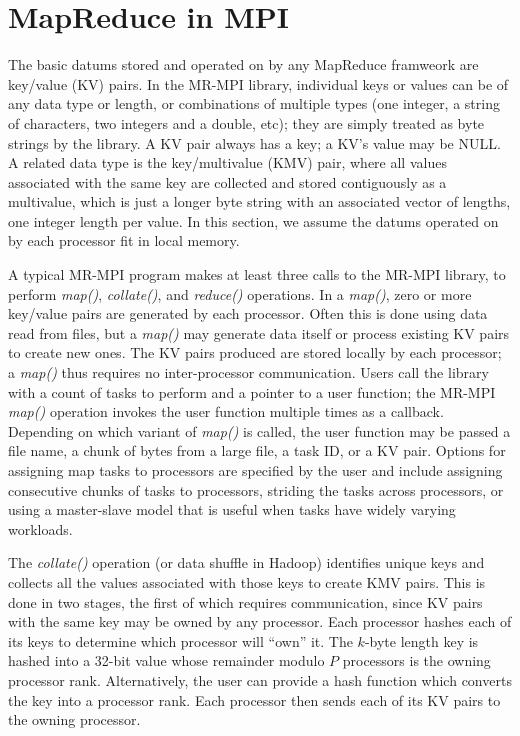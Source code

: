 \section{MapReduce in MPI}
\label{sec:mr}

The basic datums stored and operated on by any MapReduce framweork are
key/value (KV) pairs.  In the MR-MPI library, individual keys or
values can be of any data type or length, or combinations of multiple
types (one integer, a string of characters, two integers and a double,
etc); they are simply treated as byte strings by the library.  A KV
pair always has a key; a KV's value may be NULL.  A related data type
is the key/multivalue (KMV) pair, where all values associated with the
same key are collected and stored contiguously as a multivalue, which
is just a longer byte string with an associated vector of lengths, one
integer length per value.  In this section, we assume the datums
operated on by each processor fit in local memory.

A typical MR-MPI program makes at least three calls to the MR-MPI
library, to perform {\it map()}, {\it collate()}, and {\it reduce()}
operations.  In a {\it map()}, zero or more key/value pairs are
generated by each processor.  Often this is done using data read from
files, but a {\it map()} may generate data itself or process existing
KV pairs to create new ones.  The KV pairs produced are stored locally
by each processor; a {\it map()} thus requires no inter-processor
communication.  Users call the library with a count of tasks to
perform and a pointer to a user function; the MR-MPI {\it map()}
operation invokes the user function multiple times as a callback.
Depending on which variant of {\it map()} is called, the user function
may be passed a file name, a chunk of bytes from a large file, a task
ID, or a KV pair.  Options for assigning map tasks to processors are
specified by the user and include assigning consecutive chunks of
tasks to processors, striding the tasks across processors, or using a
master-slave model that is useful when tasks have widely varying
workloads.

The {\it collate()} operation (or data shuffle in Hadoop) identifies
unique keys and collects all the values associated with those keys to
create KMV pairs.  This is done in two stages, the first of which
requires communication, since KV pairs with the same key may be owned
by any processor.  Each processor hashes each of its keys to determine
which processor will ``own'' it.  The $k$-byte length key is hashed
into a 32-bit value whose remainder modulo $P$ processors is the
owning processor rank.  Alternatively, the user can provide a hash
function which converts the key into a processor rank.  Each processor
then sends each of its KV pairs to the owning processor.

